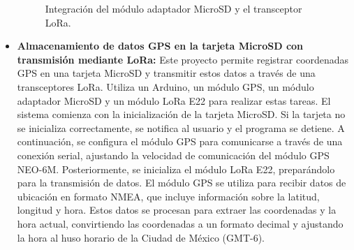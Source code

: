\begin{itemize}
		\begin{figure}[H]
		\centering
		\quad
		\caption{ Integración del módulo adaptador MicroSD y el transceptor LoRa.}
	\end{figure}
	\item \textbf{Almacenamiento de datos GPS en la tarjeta MicroSD con transmisión mediante LoRa:} Este proyecto permite registrar coordenadas GPS en una tarjeta MicroSD y transmitir estos datos a través de una transceptores LoRa. Utiliza un Arduino, un módulo GPS, un módulo adaptador MicroSD y un módulo LoRa E22 para realizar estas tareas.
	El sistema comienza con la inicialización de la tarjeta MicroSD. Si la tarjeta no se inicializa correctamente, se notifica al usuario y el programa se detiene. A continuación, se configura el módulo GPS para comunicarse a través de una conexión serial, ajustando la velocidad de comunicación del módulo GPS NEO-6M. Posteriormente, se inicializa el módulo LoRa E22, preparándolo para la transmisión de datos. 
	El módulo GPS se utiliza para recibir datos de ubicación en formato NMEA, que incluye información sobre la latitud, longitud y hora. Estos datos se procesan para extraer las coordenadas y la hora actual, convirtiendo las coordenadas a un formato decimal y ajustando la hora al huso horario de la Ciudad de México (GMT-6).

\end{itemize}

